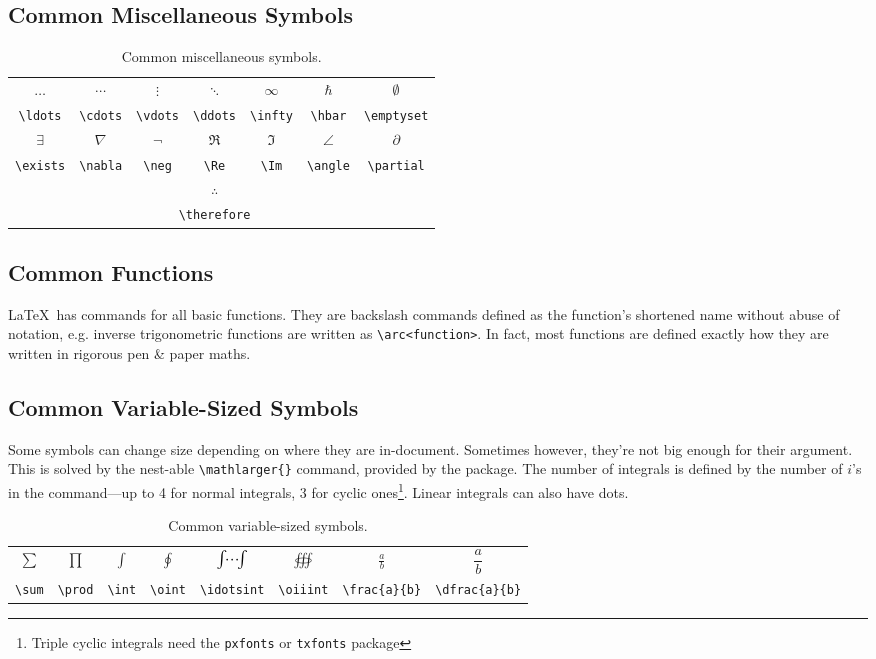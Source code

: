 \subsection{Common Miscellaneous Symbols}
%
\begin{table}[!htbp]
    \centering
    \caption{Common miscellaneous symbols.}
    \label{t:miscfym}
    \begin{tabular}{ccccccc}
        $\ldots$ & $\cdots$ & $\vdots$ & $\ddots$ & $\infty$ & $\hbar$ & $\emptyset$\\
        \verb|\ldots| & \verb|\cdots| & \verb|\vdots| & \verb|\ddots| & \verb|\infty| & \verb|\hbar| & \verb|\emptyset|\\
        $\exists$ & $\nabla$ & $\neg$ & $\Re$ & $\Im$ & $\angle$ & $\partial$\\
        \verb|\exists| & \verb|\nabla| & \verb|\neg| & \verb|\Re| & \verb|\Im| & \verb|\angle| & \verb|\partial|\\
        & \multicolumn{5}{c}{$\therefore$} & \\
        & \multicolumn{5}{c}{\texttt{\textbackslash therefore}} & \\
    \end{tabular}
\end{table}
%
\subsection{Common Functions}
%
\LaTeX~has commands for all basic functions.  They are backslash
commands defined as the function's shortened name without abuse of
notation, e.g. inverse trigonometric functions are written as
\verb|\arc<function>|.  In fact, most functions are defined exactly
how they are written in rigorous pen \& paper maths.
%
\subsection{Common Variable-Sized Symbols}
%
Some symbols can change size depending on where they are in-document.
Sometimes however, they're not big enough for their argument.  This is
solved by the nest-able \verb|\mathlarger{}| command, provided by the
 package.  The number of integrals is defined by the
number of $i$'s in the command---up to 4 for normal integrals, 3 for
cyclic ones\footnote{Triple cyclic integrals need the \texttt{pxfonts}
  or \texttt{txfonts} package}.  Linear integrals can also have dots.
\begin{table}[!htbp]
    \centering
    \caption{Common variable-sized symbols.}
    \label{t:vss}
    \begin{tabular}{cccccccc}
        $\sum$ & $\prod$ & $\int$ & $\oint$ & $\idotsint$ & $\oiiint$ & $\frac{a}{b}$ & $\dfrac{a}{b}$ \\
        \verb|\sum| & \verb|\prod| & \verb|\int| & \verb|\oint| & \verb|\idotsint| & \verb|\oiiint| & \verb|\frac{a}{b}| & \verb|\dfrac{a}{b}| \\
    \end{tabular}
\end{table}
%
